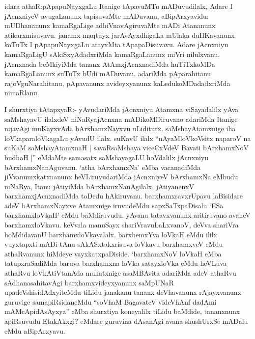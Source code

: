 
\begin{artha}
idara athaR:\ndash  pApapuNayxgaLu Itanige tApavuMTu mADuvudilalx, Adare I jAcnxniyeV avugaLanunx tapisuvaMte mADuvanu, aBipArxyavidu: mUDhananunx kamaRgaLige adhiVnavAgiruvaMte mADi Atananunx atikarxmisuvavu. janamx maqtuyx jarAvAyxdhigaLa mUlaka duHKavanunx koTuTx I pApapuNayxgaLu atayxMta tApapaDisuvavu. Adare jAcnxniyu kamaRgaLigU sAkiSxyAdadxriMda kamaRgaLanunx miVri nilulxvanu. jAcnxnada beMkiyiMda tananx AtAmxjAcnxnadiMda huTiTxkoMDa kamaRgaLanunx suTuTx bUdi mADuvanu. adariMda pAparahitanu rajoVguNarahitanu, pApavanunx avideyxyanunx kaLedukoMDadadxriMda nimaRlanu.
\end{artha}


\begin{artha}
I shurxtiya tAtapxyaR:- yAvudariMda jAcnxniyu Atamxna viSayadalilx yAva saMshayavU ilalxdeV niNaRyajAcnxna mADikoMDiruvano adariMda Itanige nijavAgi muKayxvAda bArxhamxNayxvu uLiditutx. saMshayAtamxnige iha loVkaparaloVkagaLu yAvudU ilalx. suKavU ilalx ``nAyaMloVkoVsitx naparoV na suKaM saMshayAtamxnaH | savaRsaMshaya viceCxVdeV Bavati bArxhamxNoV budhaH |'' eMdaMte samasatx saMshayagaLU hoVdalilx jAcnxniyu bArxhamxNanAguvanu. `atha bArxhamxNa' eMba vacanadiMda jiVvanumxkatxnanunx heVLiruvudariMda jAcnxniyeV bArxhamxNa eMbudu niNaRya, Itanu jAtiyiMda bArxhamxNanAgilalx, jAtiyanenxV barxhamxjAcnxnadiMda toDedu hAkiruvanu. barxhamxsavxrUpavu laBisidare adeV bArxhamxNayxve Atamxnige iruvudeMdu sapxSaTxpaDisalu `ESa barxhamxloVkaH' eMdu baMdiruvudu. yAvanu tatavxvanunx aritiruvano avaneV barxhamxloVkavu. keVvala manuSayx shariVravuLaLxvanoV, deVva shariVra hoMdidavanU barxhamxloVkavalalx. barxhemxYva loVkaH eMdu ililx vuyxtapxti mADi tAnu sAkASxtakxrisuva loVkavu barxhamxveV eMdu athaRvanunx hiMdeye vayxkatxpaDiside. `barxhamxNoV loVkaH eMba tatupxraSadiMda baruva barxhamxna loVka satayxloVka eMdu heVLuva athaRvu loVkAtiVtanAda mukatxnige asaMBAvita adariMda adeV athaRvu sAdhanasahitavAgi barxhamxvideyxyanunx saMpUNaR upadeVshisidAdxyiteMdu tiLidu janakanu tananx deVhavanunx rAjayxvanunx guruvige samapiRsidaneMdu ``soV\s haM BagavateV videVhAnf dadAmi mAMcApidAsAyxya'' eMba shurxtiya koneyalilx tiLidu baMdide, tananxnunx apiRsuvudu EtakAkxgi? eMdare guruvina dAsanAgi avana shushUrxSe mADalu eMdu aBipArxyavu.
\end{artha}

